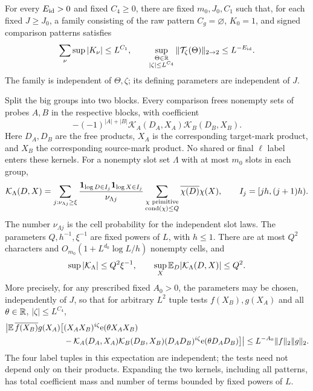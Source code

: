 \begin{proposition}\label{prop:ideal-family}
For every $E_{\rm id}>0$ and fixed $C_4\geq0$, there are fixed
$m_0,J_0,C_1$ such that, for each fixed $J\geq J_0$, a family
consisting of the raw pattern $C_g=\varnothing$, $K_0=1$, and signed
comparison patterns satisfies
\begin{equation}\label{cor:ideal-bound}
 \sum_\nu\sup|K_\nu|\leq L^{C_1},\qquad
 \sup_{\substack{\Theta\in\mathbb R\\|\zeta|\leq L^{C_4}}}
       \|\mathcal T_\zeta(\Theta)\|_{2\to2}\leq L^{-E_{\rm id}}.
\end{equation}
The family is independent of $\Theta,\zeta$; its defining parameters
are independent of $J$.

Split the big groups into two blocks.  Every comparison frees nonempty
sets of probes $A,B$ in the respective blocks, with coefficient
\begin{equation}\label{cor:comparison-kernel}
 -(-1)^{|A|+|B|}\mathcal K_A(D_A,X_A)\mathcal K_B(D_B,X_B).
\end{equation}
Here $D_A,D_B$ are the free products, $X_A$ is the corresponding
target-mark product, and $X_B$ the corresponding source-mark product.
No shared or final $\ell$ label enters these kernels.  For a nonempty
slot set $\Lambda$ with at most $m_0$ slots in each group,
\begin{equation}\label{cor:cell-kernel}
 \mathcal K_\Lambda(D,X)
 =\sum_{j:\nu_{\Lambda j}\geq\xi}
   \frac{\mathbf{1}_{\log D\in I_j}\mathbf{1}_{\log X\in I_j}}{\nu_{\Lambda j}}
   \sum_{\substack{\chi\text{ primitive}\\\operatorname{cond}(\chi)\leq Q}}
        \overline{\chi(D)}\chi(X),
 \qquad I_j=[jh,(j+1)h).
\end{equation}
The number $\nu_{\Lambda j}$ is the cell probability for the
independent slot laws.  The parameters $Q,h^{-1},\xi^{-1}$ are fixed
powers of $L$, with $h\leq1$.  There are at most $Q^2$ characters
and $O_{m_0}(1+L^{d_0}\log L/h)$ nonempty cells, and
\[
 \sup|\mathcal K_\Lambda|\leq Q^2\xi^{-1},\qquad
 \sup_X\mathbb E_D|\mathcal K_\Lambda(D,X)|\leq Q^2.
\]
More precisely, for any prescribed fixed $A_0>0$, the parameters may
be chosen, independently of $J$, so that for arbitrary $L^2$ tuple
tests $f(X_B),g(X_A)$ and all $\theta\in\mathbb R$, $|\zeta|\leq L^{C_4}$,
\begin{align}
 \big|\mathbb E\,\overline{f(X_B)}g(X_A)
 \big[&(X_AX_B)^{i\zeta}\mathrm{e}(\theta X_AX_B)\notag\\
 &-\mathcal K_A(D_A,X_A)\mathcal K_B(D_B,X_B)
       (D_AD_B)^{i\zeta}\mathrm{e}(\theta D_AD_B)\big]\big|
 \leq L^{-A_0}\|f\|_2\|g\|_2.
 \label{cor:comparison-contract}
\end{align}
The four label tuples in this expectation are independent; the tests
need not depend only on their products.  Expanding the two kernels,
including all patterns, has total coefficient mass and number of terms
bounded by fixed powers of $L$.
\end{proposition}

